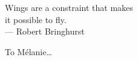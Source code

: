 \cleardoublepage
\thispagestyle{empty}


\vspace*{3cm}

\begin{raggedleft}
    	Wings are a constraint that makes \\
	it possible to fly.\\
     --- Robert Bringhurst\\
\end{raggedleft}

\vspace{4cm}

\begin{center}
    To M\'elanie\dots
\end{center}


